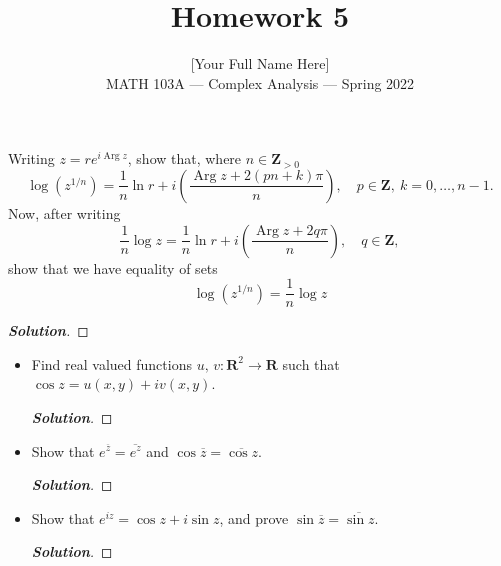 \documentclass[11pt]{article}
\newenvironment{problem}[2][Problem\!]{\begin{trivlist}
\item[\hskip \labelsep {\bfseries #1}\hskip \labelsep {\bfseries #2.}]}{\end{trivlist}}
\newenvironment{solution}{\begin{proof}[\textbf{\textit{Solution}}]}{\end{proof}}
\newcommand{\zz}{\mathbf Z}   %
\newcommand{\rr}{\mathbf R}   %
\newcommand{\parg}{\operatorname{Arg}} %
\begin{document}
 
\title{Homework 5}
\author{[Your Full Name Here]\\[0.5em]
MATH 103A --- Complex Analysis --- Spring 2022}
\date{} 
\maketitle


\begin{problem}{5.1}
Writing $z = re^{i\parg z}$, show that, where $n \in \zz_{>0}$
\[\log(z^{1/n}) = \frac{1}{n}\ln r + i\left(\frac{\parg z + 2(pn + k)\pi}{n}\right),\quad p\in\zz,\ k = 0,\ldots,n-1.\]
Now, after writing 
\[\frac{1}{n}\log z = \frac{1}{n}\ln r + i\left(\frac{\parg z + 2q\pi}{n}\right),\quad q \in \zz,\]
show that we have equality of sets
\[\log(z^{1/n}) = \frac{1}{n}\log z\]
\end{problem}
\begin{solution}
\end{solution}

\newpage  %

\begin{problem}{5.2}\hfill
\begin{itemize}[itemsep=3em]
\item[(a)] Find real valued functions $u,\, v : \rr^2 \to \rr$ such that $\cos z = u(x, y) + iv(x, y)$.
\begin{solution}
\end{solution}

\item[(b)] Show that $e^{\overline{z}} = \overline{e^z}$ and $\cos\overline{z} = \overline{\cos z}$.
\begin{solution}
\end{solution}

\item[(c)] Show that $e^{iz} = \cos z + i\sin z$, and prove $\sin\overline{z} = \overline{\sin z}$.
\begin{solution}
\end{solution}

\end{itemize}
\end{problem}
\end{document}
